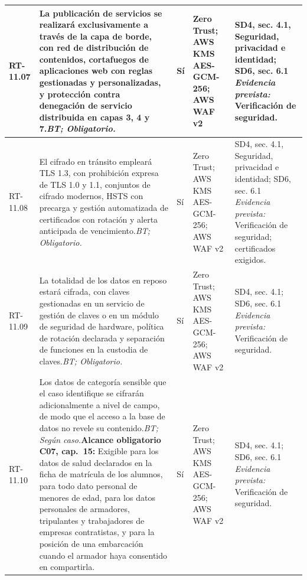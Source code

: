\begin{paginaHorizontalSynaptix}
\begin{longtable}{|L{0.09\AnchoMatrizTDoce}|L{0.385\AnchoMatrizTDoce}|L{0.065\AnchoMatrizTDoce}|L{0.18\AnchoMatrizTDoce}|L{0.28\AnchoMatrizTDoce}|}
RT-\allowbreak{}11.\allowbreak{}07 &
La publicación de servicios se realizará exclusivamente a través de la capa de borde, con red de distribución de contenidos, cortafuegos de aplicaciones web con reglas gestionadas y personalizadas, y protección contra denegación de servicio distribuida en capas 3, 4 y 7.\newline\textit{BT; Obligatorio.} &
Sí &
Zero Trust; AWS KMS AES-GCM-256; AWS WAF v2 &
SD4, sec. 4.1, Seguridad, privacidad e identidad; SD6, sec. 6.1 \newline\textit{Evidencia prevista:} Verificación de seguridad. \\ \hline

RT-\allowbreak{}11.\allowbreak{}08 &
El cifrado en tránsito empleará TLS 1.3, con prohibición expresa de TLS 1.0 y 1.1, conjuntos de cifrado modernos, HSTS con precarga y gestión automatizada de certificados con rotación y alerta anticipada de vencimiento.\newline\textit{BT; Obligatorio.} &
Sí &
Zero Trust; AWS KMS AES-GCM-256; AWS WAF v2 &
SD4, sec. 4.1, Seguridad, privacidad e identidad; SD6, sec. 6.1 \newline\textit{Evidencia prevista:} Verificación de seguridad; certificados exigidos. \\ \hline

RT-\allowbreak{}11.\allowbreak{}09 &
La totalidad de los datos en reposo estará cifrada, con claves gestionadas en un servicio de gestión de claves o en un módulo de seguridad de hardware, política de rotación declarada y separación de funciones en la custodia de claves.\newline\textit{BT; Obligatorio.} &
Sí &
Zero Trust; AWS KMS AES-GCM-256; AWS WAF v2 &
SD4, sec. 4.1; SD6, sec. 6.1 \newline\textit{Evidencia prevista:} Verificación de seguridad. \\ \hline

RT-\allowbreak{}11.\allowbreak{}10 &
Los datos de categoría sensible que el caso identifique se cifrarán adicionalmente a nivel de campo, de modo que el acceso a la base de datos no revele su contenido.\newline\textit{BT; Según caso.}\newline\textbf{Alcance obligatorio C07, cap.~15:} Exigible para los datos de salud declarados en la ficha de matrícula de los alumnos, para todo dato personal de menores de edad, para los datos personales de armadores, tripulantes y trabajadores de empresas contratistas, y para la posición de una embarcación cuando el armador haya consentido en compartirla. &
Sí &
Zero Trust; AWS KMS AES-GCM-256; AWS WAF v2 &
SD4, sec. 4.1; SD6, sec. 6.1 \newline\textit{Evidencia prevista:} Verificación de seguridad. \\ \hline


\end{longtable}
\end{paginaHorizontalSynaptix}
